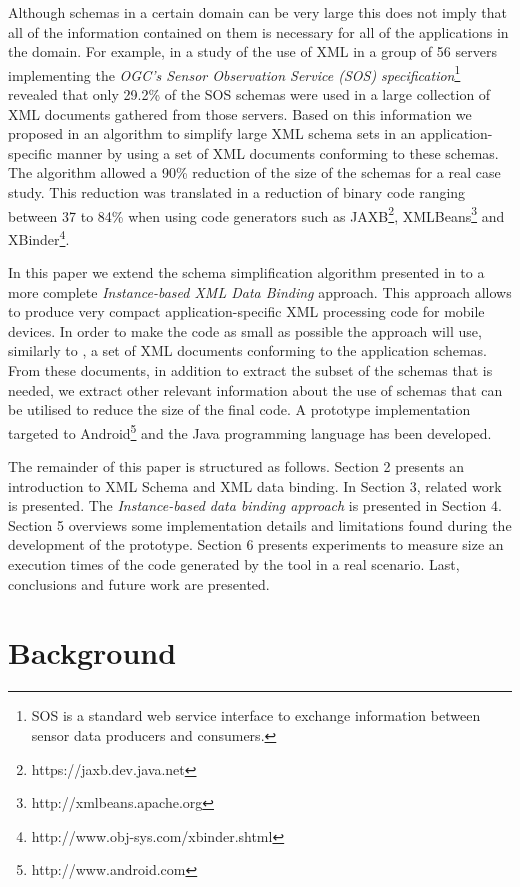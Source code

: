 \documentclass{sig-alternate}
\begin{document}
Although schemas in a certain domain can be very large this does not imply that all of the information contained on them is necessary for all of the applications in the domain. 
For example, in \cite{coll:tamayo1} a study of the use of XML in a group of 56 servers implementing the \textit{OGC's Sensor Observation Service (SOS) specification}\footnote{SOS is a standard web service interface to exchange information between sensor data producers and consumers\cite{ogc:sos}.}  revealed that only 29.2\% of the SOS schemas were used in a large collection of XML documents gathered from those servers. 
Based on this information we proposed in \cite{proc:tamayo4} an algorithm to simplify large XML schema sets in an application-specific manner by using a set of XML documents conforming to these schemas. 
The algorithm allowed a 90\% reduction of the size of the schemas for a real case study. 
This reduction was translated in a reduction of binary code ranging between 37 to 84\% when using code generators such as JAXB\footnote{https://jaxb.dev.java.net}, XMLBeans\footnote{http://xmlbeans.apache.org} and XBinder\footnote{http://www.obj-sys.com/xbinder.shtml}.

In this paper we extend the schema simplification algorithm presented in \cite{proc:tamayo4} to a more complete \textit{Instance-based XML Data Binding} approach. 
This approach allows to produce very compact application-specific XML processing code for mobile devices. 
In order to make the code as small as possible the approach will use, similarly to \cite{proc:tamayo4}, a set of XML documents conforming to the application schemas. 
From these documents, in addition to extract the subset of the schemas that is needed, we extract other relevant information about the use of schemas that can be utilised to reduce the size of the final code.  
A prototype implementation targeted to Android\footnote{http://www.android.com} and the Java programming language has been developed.  

The remainder of this paper is structured as follows. Section 2 presents an introduction to XML Schema and XML data binding. In Section 3, related work is presented. The \textit{Instance-based data binding approach} is presented in Section 4. Section 5 overviews some implementation details and limitations found during the development of the prototype. Section 6 presents experiments to measure size an execution times of the code generated by the tool in a real scenario. Last, conclusions and future work are presented. 

\section{Background}
\end{document}
